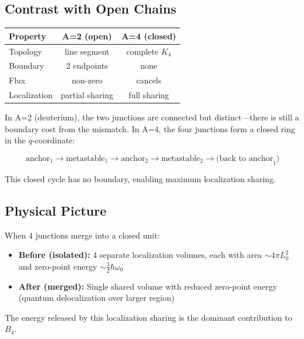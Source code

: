 \subsection{Contrast with Open Chains}

\begin{center}
\begin{tabular}{lcc}
    \toprule
    Property & A=2 (open) & A=4 (closed) \\
    \midrule
    Topology & line segment & complete $K_4$ \\
    Boundary & 2 endpoints & none \\
    Flux & non-zero & cancels \\
    Localization & partial sharing & full sharing \\
    \bottomrule
\end{tabular}
\end{center}

In A=2 (deuterium), the two junctions are connected but distinct---there
is still a boundary cost from the mismatch. In A=4, the four junctions
form a closed ring in the $q$-coordinate:

\begin{equation}
    \text{anchor}_1 \to \text{metastable}_1 \to
    \text{anchor}_2 \to \text{metastable}_2 \to \text{(back to anchor}_1\text{)}
\end{equation}

This closed cycle has no boundary, enabling maximum localization sharing. \tagP

\subsection{Physical Picture}

When 4 junctions merge into a closed unit:

\begin{itemize}
    \item \textbf{Before (isolated):} 4 separate localization volumes,
          each with area $\sim 4\pi L_0^2$ and zero-point energy
          $\sim \frac{3}{2}\hbar\omega_0$
    \item \textbf{After (merged):} Single shared volume with reduced
          zero-point energy (quantum delocalization over larger region)
\end{itemize}

The energy released by this localization sharing is the dominant
contribution to $B_4$. \tagP

